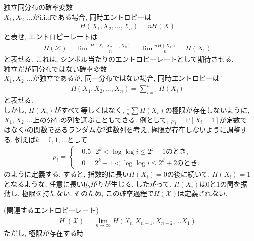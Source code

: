 \documentclass[a4j]{jsarticle}
\begin{document}
 独立同分布の確率変数\\

$X_1, X_2, \ldots$がi.i.dである場合, 同時エントロピーは
\begin{align}
	H(X_1, X_2, \ldots, X_n) = nH(X)
\end{align}
と表せ, エントロピーレートは
\begin{align}
	H(\mathcal{X}) = \lim \frac{H(X_1, X_2, \ldots, X_n)}{n} = \lim \frac{nH(X_1)}{n} = H(X_1)
\end{align}
と表せる. これは, シンボル当たりのエントロピーレートとして期待させる.\\

 独立だが同分布ではない確率変数\\

$X_1, X_2, \ldots$が独立であるが, 同一分布ではない場合, 同時エントロピーは
\begin{align}
	H(X_1, X_2, \ldots, X_n) = \sum_{i=1}^{n} H(X_i)
\end{align}
と表せる.\\

しかし, $H(X_i)$がすべて等しくはなく, $\frac{1}{n} \sum H(X_i)$の極限が存在しないように, $X_1, X_2, \ldots$上の分布の列を選ぶこともできる. 例として, $p_i = \mathbb{P}[X_i = 1]$が定数ではなく$i$の関数であるランダムな2進数列を考え, 極限が存在しないように調整する. 例えば$k = 0, 1, \ldots$として
\begin{align}
	p_i = \begin{cases}
		 & 0.5 \:\:\: 2^k < \log\log i \leq 2^k +1 \mbox{のとき},        \\
		 & 0 \:\:\:\:\:\: 2^k +1 < \log\log i \leq 2^k +2 \mbox{のとき}.
	\end{cases}
\end{align}
のように定義する.
すると, 指数的に長い$H(X_i)=0$の後に続いて, $H(X_i) = 1$となるような, 任意に長い広がりが生じる. したがって, $H(X_i)$は0と1の間を振動し, 極限を持たない. そのため, この確率過程で$H(\mathcal{X})$は定義されない.\\

\begin{itembox}[l]{ (関連するエントロピーレート)}
	\begin{align}
		H^\prime(\mathcal{X}) = \lim_{n \rightarrow \infty} H(X_n | X_{n-1}, X_{n-2}, \ldots X_1)
	\end{align}
	ただし, 極限が存在する時
\end{itembox}\\
\end{document}
